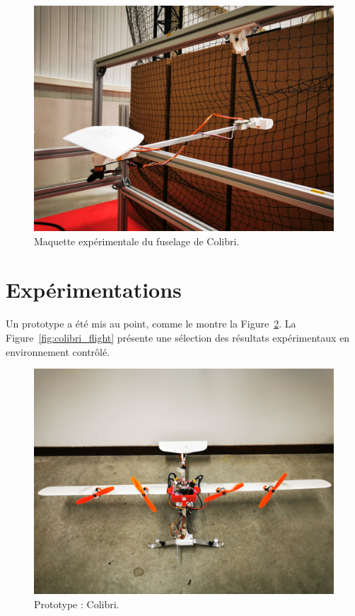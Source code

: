 \begin{figure}[ht!]
    \centering
    \includegraphics[trim={0 15cm 0 25cm},clip, width=0.6\columnwidth]{figures/IMG_20230120_141852.jpg}
    \caption{Maquette expérimentale du fuselage de Colibri.}
    \label{fig:colibri_fus}
\end{figure}




\section{Expérimentations}
\label{sec:exp}
Un prototype a été mis au point, comme le montre la Figure~\ref{fig:colibri_real}. La Figure~\ref{fig:colibri_flight} présente une sélection des résultats expérimentaux en environnement contrôlé.


\begin{figure}[ht!]
    \centering
    \includegraphics[trim={0 15cm 0 25cm},clip, width=0.6\columnwidth]{figures/colibri_real.jpg}
    \caption{Prototype : Colibri.}
    \label{fig:colibri_real}
\end{figure}

